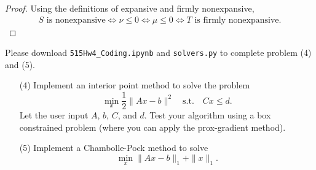 \documentclass[11pt]{amsart}
\begin{document}
\begin{enumerate}
\begin{enumerate}
\begin{proof}
  Using the definitions of expansive and firmly nonexpansive,
  \begin{align*}
    \text{$S$ is nonexpansive}
    \Leftrightarrow \nu \leq 0
    \Leftrightarrow \mu \leq 0
    \Leftrightarrow \text{$T$ is firmly nonexpansive.}
  \end{align*}
\end{proof}

\end{enumerate}

\end{enumerate}
\newpage
{}
\vskip 8pt \noindent
Please download \texttt{515Hw4\_Coding.ipynb} and \texttt{solvers.py} to complete problem (4) and (5).
\vskip 8pt

\begin{enumerate}

\item[(4)] Implement an interior point method to solve the problem 
\[
\min_x \frac{1}{2}\|Ax-b\|^2 \quad \mbox{s.t.} \quad Cx \leq d. 
\]
Let the user input $A$, $b$, $C$, and $d$. Test your algorithm using a box constrained problem 
(where you can apply the prox-gradient method). 

\bigskip\bigskip\bigskip






\bigskip\bigskip\bigskip



\item[(5)] Implement a Chambolle-Pock method to solve  
\[
\min_{x} \|Ax-b\|_1 + \|x\|_1. 
\]





\end{enumerate}
\end{document}
